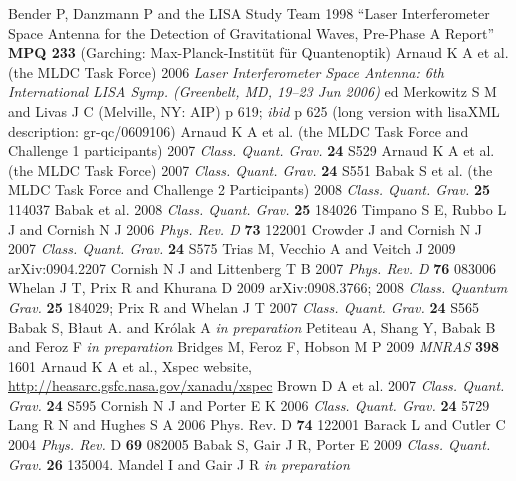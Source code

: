 \documentclass{iopart}
\begin{document}
\begin{thebibliography}{99}
%
 Bender P, Danzmann P and the LISA Study Team 1998 ``Laser Interferometer Space Antenna for the Detection of Gravitational Waves, Pre-Phase A Report'' \textbf{MPQ 233} (Garching: Max-Planck-Instit\"ut f\"ur Quantenoptik) 
%
 Arnaud K A et al. (the MLDC Task Force) 2006 \textit{Laser Interferometer Space Antenna: 6th International LISA Symp. (Greenbelt, MD, 19--23 Jun 2006)} ed Merkowitz S M and Livas J C (Melville, NY: AIP) p 619; \textit{ibid} p 625 (long version with lisaXML description: gr-qc/0609106)
%
 Arnaud K A et al. (the MLDC Task Force and Challenge 1 participants) 2007 \textit{Class. Quant. Grav.} \textbf{24} S529
%
 Arnaud K A et al. (the MLDC Task Force) 2007 \textit{Class. Quant. Grav.} \textbf{24} S551
%
 Babak S et al. (the MLDC Task Force and Challenge 2 Participants) 2008 \textit{Class. Quant. Grav.} \textbf{25} 114037
%
 Babak et al. 2008 \textit{Class. Quant. Grav.} \textbf{25} 184026
%
 Timpano S E, Rubbo L J and Cornish N J 2006 \textit{Phys. Rev. D} \textbf{73} 122001
%
 Crowder J and Cornish N J 2007 \textit{Class. Quant. Grav.}  \textbf{24} S575
%
 Trias M, Vecchio A and Veitch J 2009 arXiv:0904.2207 
%
 Cornish N J and Littenberg T B 2007 \textit{Phys. Rev. D} \textbf{76} 083006
%
 Whelan J T, Prix R and Khurana D 2009 arXiv:0908.3766;
2008 \textit{Class. Quantum Grav.} \textbf{25} 184029;
Prix R and Whelan J T 2007 \textit{Class. Quant. Grav.} \textbf{24} S565 
%
 Babak S, B{\l}aut A. and Kr{\'o}lak A \textit{in preparation}
%
 Petiteau A, Shang Y, Babak B and Feroz F \textit{in preparation}
%
 Bridges M, Feroz F, Hobson M P 2009 \textit{MNRAS} \textbf{398} 1601
%
 Arnaud K A et al., Xspec website, \url{http://heasarc.gsfc.nasa.gov/xanadu/xspec}
%
 Brown D A et al. 2007 \textit{Class. Quant. Grav.} \textbf{24} S595  
%
 Cornish N J and Porter E K 2006 \textit{Class. Quant. Grav.} \textbf{24} 5729
%
 Lang R N and Hughes S A 2006 Phys. Rev. D \textbf{74} 122001
%
 Barack L and Cutler C 2004 \textit{Phys. Rev.} D \textbf{69} 082005
%
 Babak S, Gair J R, Porter E 2009 \textit{Class. Quant. Grav.} \textbf{26} 135004.
%
 Mandel I and Gair J R \textit{in preparation}

\end{thebibliography}
\end{document}
